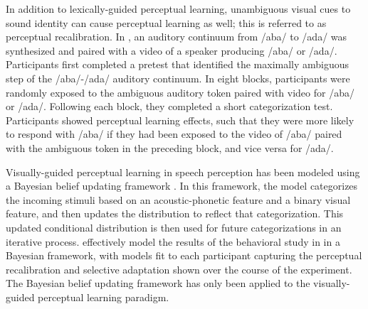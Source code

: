 In addition to lexically-guided perceptual learning, unambiguous visual cues to sound identity can cause perceptual learning as well; this is referred to as perceptual recalibration.
In \citet{Bertelson2003}, an auditory continuum from /aba/ to /ada/ was synthesized and paired with a video of a speaker producing /aba/ or /ada/.  
Participants first completed a pretest that identified the maximally ambiguous step of the /aba/-/ada/ auditory continuum. 
In eight blocks, participants were randomly exposed to the ambiguous auditory token paired with video for /aba/ or /ada/.  Following each block, they completed a short categorization test.  
Participants showed perceptual learning effects, such that they were more likely to respond with /aba/ if they had been exposed to the video of /aba/ paired with the ambiguous token in the preceding block, and vice versa for /ada/.


Visually-guided perceptual learning in speech perception has been modeled using a Bayesian belief updating framework \citep{Kleinschmidt2011}.  
In this framework, the model categorizes the incoming stimuli based on an acoustic-phonetic feature and a binary visual feature, and then updates the distribution to reflect that categorization.
This updated conditional distribution is then used for future categorizations in an iterative process.  
\citet{Kleinschmidt2011} effectively model the results of the behavioral study in \citet{Vroomen2007} in a Bayesian framework, with models fit to each participant capturing the perceptual recalibration and selective adaptation shown over the course of the experiment.
The Bayesian belief updating framework has only been applied to the visually-guided perceptual learning paradigm.

